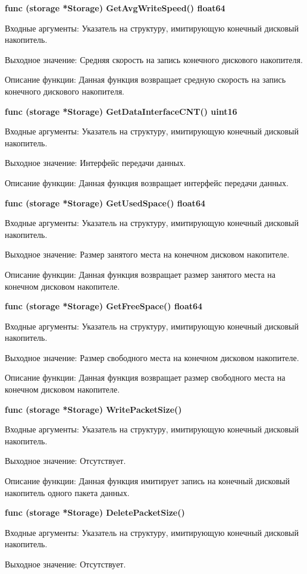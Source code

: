 \textbf{func (storage *Storage) GetAvgWriteSpeed() float64}

Входные аргументы: Указатель на структуру, имитирующую конечный дисковый накопитель.

Выходное значение: Средняя скорость на запись конечного дискового накопителя.

Описание функции: Данная функция возвращает средную скорость на запись конечного дискового накопителя.
 

\textbf{func (storage *Storage) GetDataInterfaceCNT() uint16}

Входные аргументы: Указатель на структуру, имитирующую конечный дисковый накопитель.

Выходное значение: Интерфейс передачи данных. 

Описание функции: Данная функция возвращает интерфейс передачи данных.

\textbf{func (storage *Storage) GetUsedSpace() float64 }

Входные аргументы: Указатель на структуру, имитирующую конечный дисковый накопитель.

Выходное значение:  Размер занятого места на конечном дисковом накопителе.

Описание функции: Данная функция возвращает размер занятого места на конечном дисковом накопителе.

\textbf{func (storage *Storage) GetFreeSpace() float64}

Входные аргументы: Указатель на структуру, имитирующую конечный дисковый накопитель.

Выходное значение: Размер свободного места на конечном дисковом накопителе.

Описание функции: Данная функция возвращает размер свободного места на конечном дисковом накопителе.

\textbf{func (storage *Storage) WritePacketSize() }

Входные аргументы: Указатель на структуру, имитирующую конечный дисковый накопитель.

Выходное значение: Отсутствует.

Описание функции: Данная функция имитирует запись на конечный дисковый накопитель одного пакета данных.

\textbf{func (storage *Storage) DeletePacketSize()}

Входные аргументы: Указатель на структуру, имитирующую конечный дисковый накопитель.

Выходное значение: Отсутствует.

